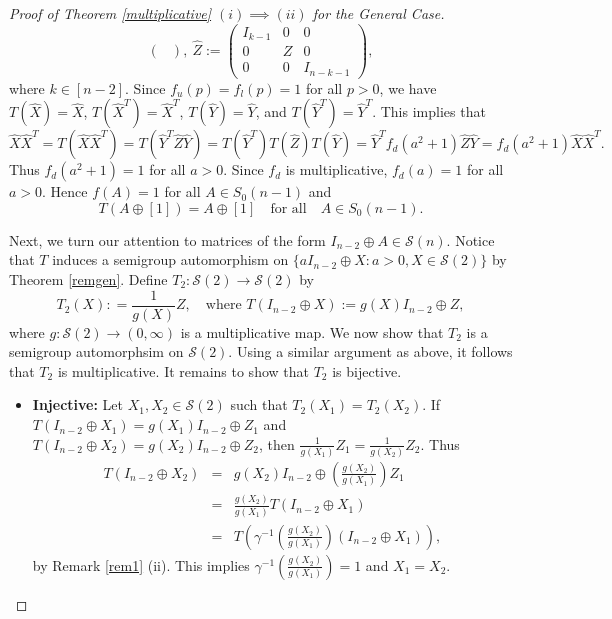 \documentclass[11pt,reqno]{amsart}
\theoremstyle{plain}
\theoremstyle{definition}
\numberwithin{equation}{section}
\def\cS{\mathcal S}
\begin{document}
\begin{proof}[Proof of Theorem \ref{multiplicative} $(i)\implies (ii)$ for the General Case]
\[\begin{pmatrix}
\end{pmatrix},~ \hat Z:=\begin{pmatrix}
I_{k-1} & 0& 0\\ 0 & Z & 0\\0 & 0& I_{n-k-1}
\end{pmatrix},\]
where $k\in [n-2]$. Since $f_u(p)=f_l(p)=1$ for all $p>0$, we have $T(\hat X) = \hat X$, $T(\hat X^T) = \hat X^T$, $T(\hat Y) = \hat Y$, and $T(\hat Y^T) = \hat Y^T$. This implies that
\[\hat X {\hat X}^T = T(\hat X {\hat X}^T) = T({\hat Y}^T\hat Z\hat Y) = T({\hat Y}^T)T(\hat Z) T(\hat Y) = {\hat Y}^T f_d(a^2+1)\hat Z \hat Y = f_d(a^2+1) \hat X{\hat X}^T.\]
Thus $f_d(a^2+1) = 1$ for all $a> 0$. Since $f_d$ is multiplicative, $f_d(a) = 1$ for all $a>0$. Hence $f(A)=1$ for all $A \in S_0(n-1)$ and
\begin{equation}\label{pcmaineq1}
T(A\oplus [1] )=A \oplus [1]\quad  \text{for all}\quad A \in S_0(n-1). 
\end{equation}
	
Next, we turn our attention to matrices of the form $I_{n-2}\oplus A \in \cS(n)$.  Notice that $T$ induces a semigroup automorphism on
	$\{aI_{n-2} \oplus X: a>0, X \in \cS(2)\}$ by Theorem \ref{remgen}.
	Define $ T_2: \cS(2) \rightarrow \cS(2)$ by 
	\[T_2(X): = \frac{1}{g(X)} Z,\quad  \text{where } T (I_{n-2} \oplus X) := g(X)I_{n-2} \oplus Z,\] 
	where $g:\cS(2)\to (0,\infty)$ is a multiplicative map. We now show that $ T_2$ is a semigroup automorphsim on $\cS(2)$. Using a similar argument as above, it follows that $ T_2$ is multiplicative. It remains to show that $ T_2$ is bijective.
	\begin{itemize}
		\item \textbf{Injective:} Let $X_1,X_2 \in  \cS(2)$ such that $ T_2(X_1)= T_2(X_2)$. If $T(I_{n-2} \oplus X_1)= g(X_1)I_{n-2} \oplus Z_1$ and $ T(I_{n-2} \oplus X_2)= g(X_2)I_{n-2} \oplus Z_2$, then $\frac{1}{g(X_1)}Z_1=\frac{1}{g(X_2)}Z_2$. Thus
		\begin{eqnarray}
			 T(I_{n-2} \oplus X_2)&=& g(X_2) I_{n-2}\oplus \left(\frac{g(X_2)}{g(X_1)}\right)Z_1 \nonumber\\
			&=& \frac{g(X_2)}{g(X_1)} T(I_{n-2} \oplus X_1) \nonumber\\
			&=& T\left(\gamma^{-1}\left(\frac{g(X_2)}{g(X_1)}\right)(I_{n-2} \oplus X_1)\right), \nonumber
		\end{eqnarray}
	by Remark \ref{rem1} (ii). This implies $\gamma^{-1}\left(\frac{g(X_2)}{g(X_1)}\right)=1$ and $X_1=X_2$.
		

\end{itemize}
\end{proof}
\end{document}
